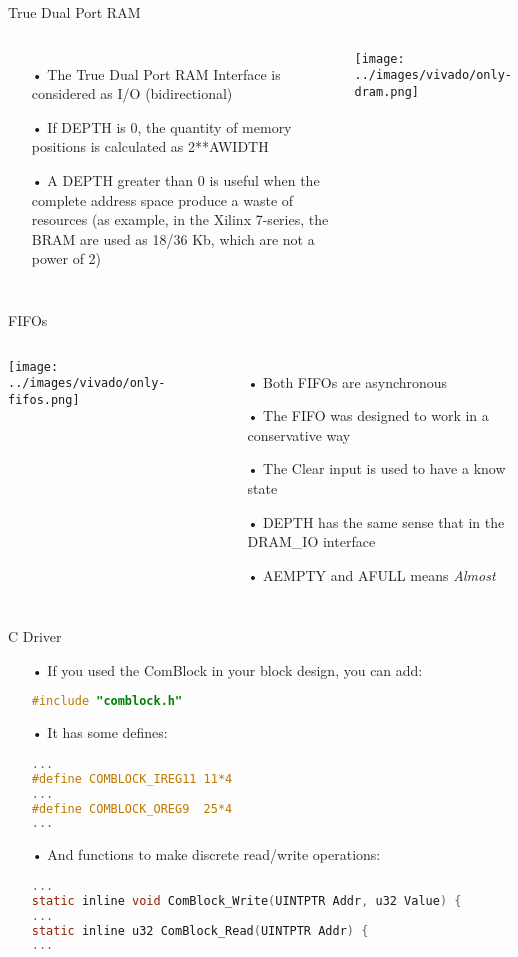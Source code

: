 \documentclass[11pt]{beamer}
\begin{document}
\begin{frame}{True Dual Port RAM}
  \begin{columns}
      \begin{itemize}
        \scriptsize
        \item[•] The True Dual Port RAM Interface is considered as I/O (bidirectional)
        \item[•] If DEPTH is 0, the quantity of memory positions is calculated as 2**AWIDTH
        \item[•] A DEPTH greater than 0 is useful when the complete address space produce a waste of resources (as example, in the Xilinx 7-series, the BRAM are used as 18/36 Kb, which are not a power of 2)
      \end{itemize}
      \center
      \texttt{[image: ../images/vivado/only-dram.png]}
    \end{columns}
\end{frame}

\begin{frame}{FIFOs}
  \begin{columns}
      \center
      \texttt{[image: ../images/vivado/only-fifos.png]}
      \begin{itemize}
        \scriptsize
        \item[•] Both FIFOs are asynchronous
        \item[•] The FIFO was designed to work in a conservative way
        \item[•] The Clear input is used to have a know state
        \item[•] DEPTH has the same sense that in the DRAM\_IO interface
        \item[•] AEMPTY and AFULL means \textit{Almost}
      \end{itemize}
    \end{columns}
\end{frame}

\begin{frame}[fragile]{C Driver}
  \begin{itemize}
    \scriptsize
    \item[•] If you used the ComBlock in your block design, you can add:
      \begin{lstlisting}[language=C, numbers=none]
#include "comblock.h"
      \end{lstlisting}
    \item[•] It has some defines:
      \begin{lstlisting}[language=C, numbers=none]
...
#define COMBLOCK_IREG11 11*4
...
#define COMBLOCK_OREG9  25*4
...
      \end{lstlisting}
    \item[•] And functions to make discrete read/write operations:
      \begin{lstlisting}[language=C, numbers=none]
...
static inline void ComBlock_Write(UINTPTR Addr, u32 Value) {
...
static inline u32 ComBlock_Read(UINTPTR Addr) {
...
      \end{lstlisting}
  \end{itemize}
\end{frame}
\end{document}
